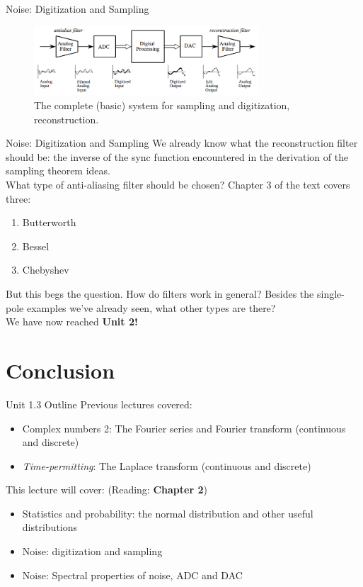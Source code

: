 \documentclass{beamer}
\begin{document}
\begin{frame}{Noise: Digitization and Sampling}
\begin{figure}
\centering
\includegraphics[width=0.75\textwidth]{figures/recon.png}
\caption{\label{fig:fulladc} The complete (basic) system for sampling and digitization, reconstruction.}
\end{figure}
\end{frame}

\begin{frame}{Noise: Digitization and Sampling}
\small
We already know what the reconstruction filter should be: the inverse of the sync function encountered in the derivation of the sampling theorem ideas. \\ \vspace{0.5cm}
What type of anti-aliasing filter should be chosen?  Chapter 3 of the text covers three:
\begin{enumerate}
\item Butterworth
\item Bessel
\item Chebyshev
\end{enumerate}
But this begs the question.  How do filters work in general?  Besides the single-pole examples we've already seen, what other types are there? \\
We have now reached \textbf{Unit 2!}
\end{frame}

\section{Conclusion}

\begin{frame}{Unit 1.3 Outline}
Previous lectures covered:
\begin{itemize}
\item Complex numbers 2: The Fourier series and Fourier transform (continuous and discrete)
\item \textit{Time-permitting}: The Laplace transform (continuous and discrete)
\end{itemize}
This lecture will cover: (Reading: \textbf{Chapter 2})
\begin{itemize}
\item \alert{Statistics and probability: the normal distribution and other useful distributions}
\item \alert{Noise: digitization and sampling}
\item \alert{Noise: Spectral properties of noise, ADC and DAC}
\end{itemize}
\end{frame}
\end{document}
